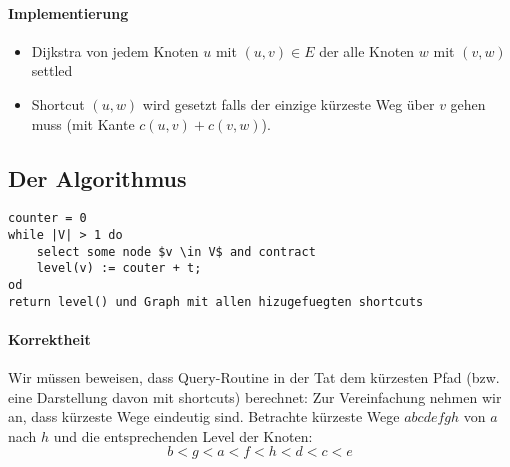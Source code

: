 \paragraph*{Implementierung}
\begin{itemize}
	\item Dijkstra von jedem Knoten $u$ mit $(u,v) \in E$ der alle Knoten $w$ mit $(v,w)$ settled
	\item Shortcut $(u,w)$ wird gesetzt falls der einzige kürzeste Weg über $v$ gehen muss (mit Kante $c(u,v)+c(v,w)$).
\end{itemize}

\subsection{Der Algorithmus}
\begin{lstlisting}[mathescape]
counter = 0
while |V| > 1 do
	select some node $v \in V$ and contract
	level(v) := couter + t;
od
return level() und Graph mit allen hizugefuegten shortcuts
\end{lstlisting}

\paragraph*{Korrektheit} Wir müssen beweisen, dass Query-Routine in der Tat dem kürzesten Pfad (bzw. eine Darstellung davon mit shortcuts) berechnet: Zur Vereinfachung nehmen wir an, dass kürzeste Wege eindeutig sind. Betrachte kürzeste Wege $abcdefgh$ von $a$ nach $h$ und die entsprechenden Level der Knoten: $$ b<g<a<f<h<d<c<e $$ %


